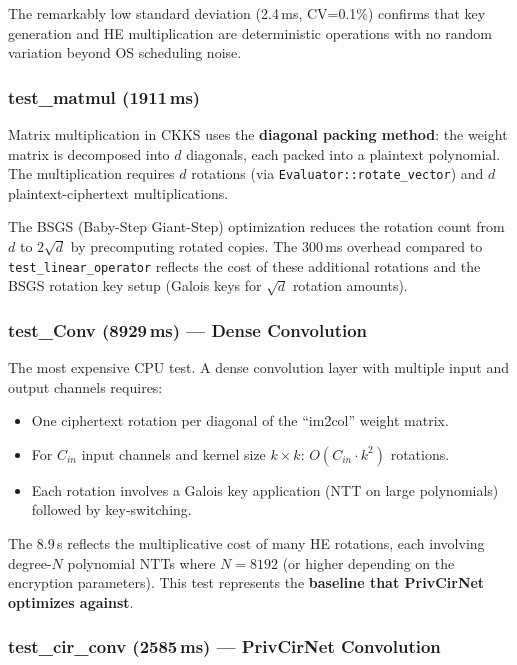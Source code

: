 The remarkably low standard deviation (2.4\,ms, CV=0.1\%) confirms that key generation and HE multiplication are deterministic operations with no random variation beyond OS scheduling noise.

\subsubsection{test\_matmul (1911\,ms)}

Matrix multiplication in CKKS uses the \textbf{diagonal packing method}: the weight matrix is decomposed into $d$ diagonals, each packed into a plaintext polynomial.
The multiplication requires $d$ rotations (via \texttt{Evaluator::rotate\_vector}) and $d$ plaintext-ciphertext multiplications.

The BSGS (Baby-Step Giant-Step) optimization reduces the rotation count from $d$ to $2\sqrt{d}$ by precomputing rotated copies.
The 300\,ms overhead compared to \texttt{test\_linear\_operator} reflects the cost of these additional rotations and the BSGS rotation key setup (Galois keys for $\sqrt{d}$ rotation amounts).

\subsubsection{test\_Conv (8929\,ms) --- Dense Convolution}

The most expensive CPU test. A dense convolution layer with multiple input and output channels requires:
\begin{itemize}[nosep]
  \item One ciphertext rotation per diagonal of the ``im2col'' weight matrix.
  \item For $C_{in}$ input channels and kernel size $k \times k$: $O(C_{in} \cdot k^2)$ rotations.
  \item Each rotation involves a Galois key application (NTT on large polynomials) followed by key-switching.
\end{itemize}

The 8.9\,s reflects the multiplicative cost of many HE rotations, each involving degree-$N$ polynomial NTTs where $N = 8192$ (or higher depending on the encryption parameters).
This test represents the \textbf{baseline that PrivCirNet optimizes against}.

\subsubsection{test\_cir\_conv (2585\,ms) --- PrivCirNet Convolution}

